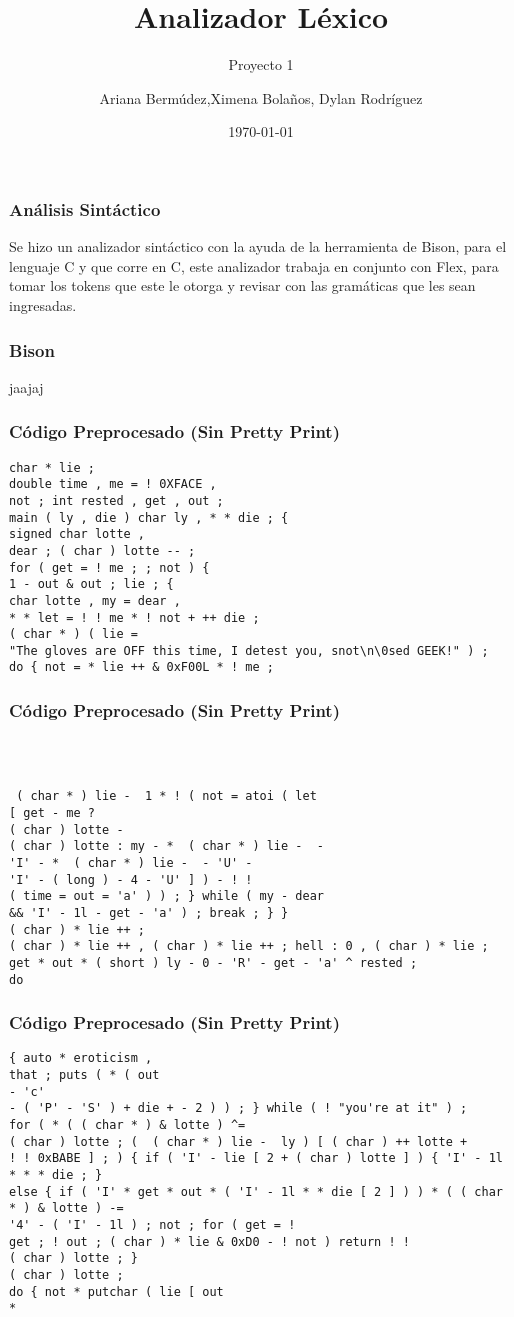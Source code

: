 \documentclass{beamer}
\title{Analizador L\'exico}
\subtitle{Proyecto 1}
\author{Ariana Berm\'udez,Ximena Bola\~nos, Dylan Rodr\'iguez}
\institute{Instituto Tecnol\'ogico de Costa Rica}
\date{\today}
\begin{document}
\begin{frame}
 \titlepage 
 \end{frame}\begin{frame}
 \frametitle{An\'alisis Sint\'actico}
  Se hizo un analizador sint\'actico con la ayuda de la herramienta de Bison, para el lenguaje C y que corre en C, este analizador trabaja en conjunto con Flex, para tomar los tokens que este le otorga y revisar con las gram\'aticas que les sean ingresadas.\end{frame}\begin{frame}
 \frametitle{Bison}
 jaajaj\end{frame}\begin{frame}[fragile]
\frametitle{C\'odigo Preprocesado (Sin Pretty Print)}
\begin{lstlisting}[style=CStyle]
char * lie ; 
double time , me = ! 0XFACE , 
not ; int rested , get , out ; 
main ( ly , die ) char ly , * * die ; { 
signed char lotte , 
dear ; ( char ) lotte -- ; 
for ( get = ! me ; ; not ) { 
1 - out & out ; lie ; { 
char lotte , my = dear , 
* * let = ! ! me * ! not + ++ die ; 
( char * ) ( lie = 
"The gloves are OFF this time, I detest you, snot\n\0sed GEEK!" ) ; 
do { not = * lie ++ & 0xF00L * ! me ; 
\end{lstlisting}
\end{frame}
\begin{frame}[fragile]
\frametitle{C\'odigo Preprocesado (Sin Pretty Print)}
\begin{lstlisting}[style=CStyle]


 
 ( char * ) lie -  1 * ! ( not = atoi ( let 
[ get - me ? 
( char ) lotte - 
( char ) lotte : my - *  ( char * ) lie -  - 
'I' - *  ( char * ) lie -  - 'U' - 
'I' - ( long ) - 4 - 'U' ] ) - ! ! 
( time = out = 'a' ) ) ; } while ( my - dear 
&& 'I' - 1l - get - 'a' ) ; break ; } } 
( char ) * lie ++ ; 
( char ) * lie ++ , ( char ) * lie ++ ; hell : 0 , ( char ) * lie ; 
get * out * ( short ) ly - 0 - 'R' - get - 'a' ^ rested ; 
do \end{lstlisting}
\end{frame}
\begin{frame}[fragile]
\frametitle{C\'odigo Preprocesado (Sin Pretty Print)}
\begin{lstlisting}[style=CStyle]
{ auto * eroticism , 
that ; puts ( * ( out 
- 'c' 
- ( 'P' - 'S' ) + die + - 2 ) ) ; } while ( ! "you're at it" ) ; 
for ( * ( ( char * ) & lotte ) ^= 
( char ) lotte ; (  ( char * ) lie -  ly ) [ ( char ) ++ lotte + 
! ! 0xBABE ] ; ) { if ( 'I' - lie [ 2 + ( char ) lotte ] ) { 'I' - 1l * * * die ; } 
else { if ( 'I' * get * out * ( 'I' - 1l * * die [ 2 ] ) ) * ( ( char * ) & lotte ) -= 
'4' - ( 'I' - 1l ) ; not ; for ( get = ! 
get ; ! out ; ( char ) * lie & 0xD0 - ! not ) return ! ! 
( char ) lotte ; } 
( char ) lotte ; 
do { not * putchar ( lie [ out 
* \end{lstlisting}
\end{frame}
\end{document}
